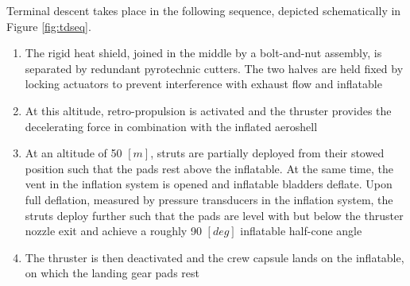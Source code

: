 Terminal descent takes place in the following sequence, depicted schematically in Figure \ref{fig:tdseq}.
\begin{enumerate}
\item The rigid heat shield, joined in the middle by a bolt-and-nut assembly, is separated by redundant pyrotechnic cutters. The two halves are held fixed by locking actuators to prevent interference with exhaust flow and inflatable
\item At this altitude, retro-propulsion is activated and the thruster provides the decelerating force in combination with the inflated aeroshell
\item At an altitude of 50 $[m]$, struts are partially deployed from their stowed position such that the pads rest above the inflatable. At the same time, the vent in the inflation system is opened and inflatable bladders deflate. Upon full deflation, measured by pressure transducers in the inflation system, the struts deploy further such that the pads are level with but below the thruster nozzle exit and achieve a roughly 90 $[deg]$ inflatable half-cone angle
\item The thruster is then deactivated and the crew capsule lands on the inflatable, on which the landing gear pads rest
\end{enumerate}
